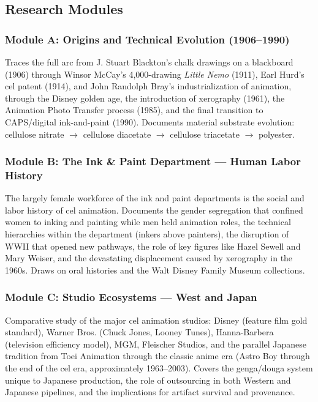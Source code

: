\documentclass[11pt,letterpaper]{article}
\begin{document}
\subsection{Research Modules}

\subsubsection{Module A: Origins and Technical Evolution (1906--1990)}
Traces the full arc from J. Stuart Blackton's chalk drawings on a blackboard (1906) through Winsor McCay's 4,000-drawing \textit{Little Nemo} (1911), Earl Hurd's cel patent (1914), and John Randolph Bray's industrialization of animation, through the Disney golden age, the introduction of xerography (1961), the Animation Photo Transfer process (1985), and the final transition to CAPS/digital ink-and-paint (1990). Documents material substrate evolution: cellulose nitrate $\rightarrow$ cellulose diacetate $\rightarrow$ cellulose triacetate $\rightarrow$ polyester.

\subsubsection{Module B: The Ink \& Paint Department --- Human Labor History}
The largely female workforce of the ink and paint departments is the social and labor history of cel animation. Documents the gender segregation that confined women to inking and painting while men held animation roles, the technical hierarchies within the department (inkers above painters), the disruption of WWII that opened new pathways, the role of key figures like Hazel Sewell and Mary Weiser, and the devastating displacement caused by xerography in the 1960s. Draws on oral histories and the Walt Disney Family Museum collections.

\subsubsection{Module C: Studio Ecosystems --- West and Japan}
Comparative study of the major cel animation studios: Disney (feature film gold standard), Warner Bros. (Chuck Jones, Looney Tunes), Hanna-Barbera (television efficiency model), MGM, Fleischer Studios, and the parallel Japanese tradition from Toei Animation through the classic anime era (Astro Boy through the end of the cel era, approximately 1963--2003). Covers the genga/douga system unique to Japanese production, the role of outsourcing in both Western and Japanese pipelines, and the implications for artifact survival and provenance.
\end{document}
